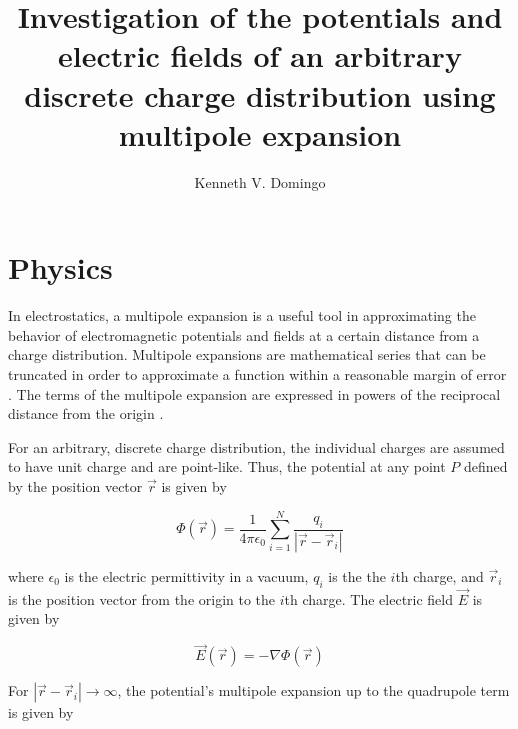 \documentclass[12pt,a4paper,twoside]{article}
\begin{document}
\title{\TitleFont Investigation of the potentials and electric fields of an arbitrary discrete charge distribution using multipole expansion}

\author[ ]{Kenneth V. Domingo\lastauthorsep}


\maketitle
\thispagestyle{titlestyle}

\section{Physics}
\label{sec:Intro}
\medskip
In electrostatics, a multipole expansion is a useful tool in approximating the behavior of electromagnetic potentials and fields at a certain distance from a charge distribution. Multipole expansions are mathematical series that can be truncated in order to approximate a function within a reasonable margin of error \cite{kinzel}. The terms of the multipole expansion are expressed in powers of the reciprocal distance from the origin \cite{griffiths}. 

For an arbitrary, discrete charge distribution, the individual charges are assumed to have unit charge and are point-like. Thus, the potential at any point $P$ defined by the position vector $\vec{r}$ is given by

\begin{equation}\label{eq:potential}
	\Phi(\vec{r}) = \frac{1}{4\pi\epsilon_0} \sum_{i=1}^N \frac{q_i}{|\vec{r} - \vec{r}_i|}
\end{equation}

where $\epsilon_0$ is the electric permittivity in a vacuum, $q_i$ is the the $i$th charge, and $\vec{r}_i$ is the position vector from the origin to the $i$th charge. The electric field $\vec{E}$ is given by

\begin{equation}\label{eq:efield}
	\vec{E}(\vec{r}) =  -\nabla \Phi(\vec{r})
\end{equation}

For $|\vec{r} - \vec{r}_i| \rightarrow \infty$, the potential's multipole expansion up to the quadrupole term is given by \cite{gradshteyn}
\end{document}
